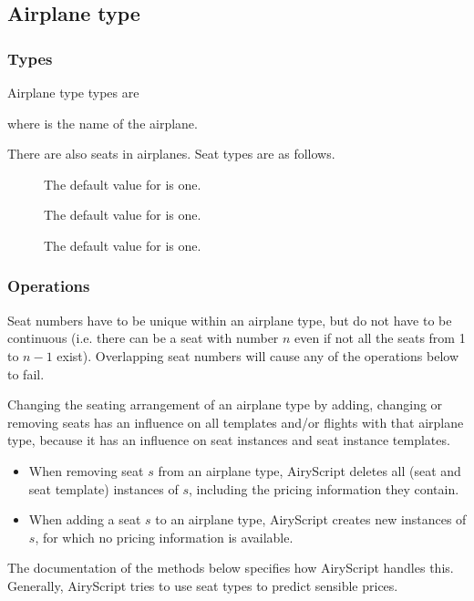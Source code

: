 \subsection{Airplane type}
\subsubsection{Types}
Airplane type types are
\begin{description}
  \item[] 
  \item[] 
\end{description}
where  is the name of the airplane.

There are also seats in airplanes. Seat types are as follows.
\begin{description}
  \item[] 
    
    The default value for  is one.

  \item[] 

    The default value for  is one.

  \item[] 

    The default value for  is one.
\end{description}

\subsubsection{Operations}
Seat numbers have to be unique within an airplane type, but do not have to be
continuous (i.e. there can be a seat with number $n$ even if not all the seats
from 1 to $n-1$ exist). Overlapping seat numbers will cause any of the
operations below to fail.

Changing the seating arrangement of an airplane type by adding, changing or
removing seats has an influence on all templates and/or flights with that
airplane type, because it has an influence on seat instances and seat instance
templates.
\begin{itemize}
  \item When removing seat $s$ from an airplane type, AiryScript deletes all
    (seat and seat template) instances of $s$, including the pricing
    information they contain.
  \item When adding a seat $s$ to an airplane type, AiryScript creates new
    instances of $s$, for which no pricing information is available.
\end{itemize}
The documentation of the methods below specifies how AiryScript handles this.
Generally, AiryScript tries to use seat types to predict sensible prices.


